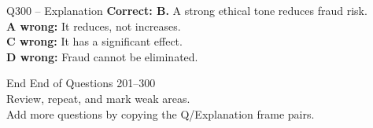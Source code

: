 \documentclass[aspectratio=169,10pt]{beamer}
\begin{document}
	\begin{frame}[t]{Q300 -- Explanation}
		\small
		\textbf{Correct: B.} A strong ethical tone reduces fraud risk. \\[4pt]
		\textbf{A wrong:} It reduces, not increases. \\[2pt]
		\textbf{C wrong:} It has a significant effect. \\[2pt]
		\textbf{D wrong:} Fraud cannot be eliminated.
	\end{frame}
	
	\begin{frame}{End}
		\centering
		\Large End of Questions 201--300\\[8pt]
		\normalsize Review, repeat, and mark weak areas.\\[4pt]
		\small Add more questions by copying the Q/Explanation frame pairs.
	\end{frame}
	
\end{document}
